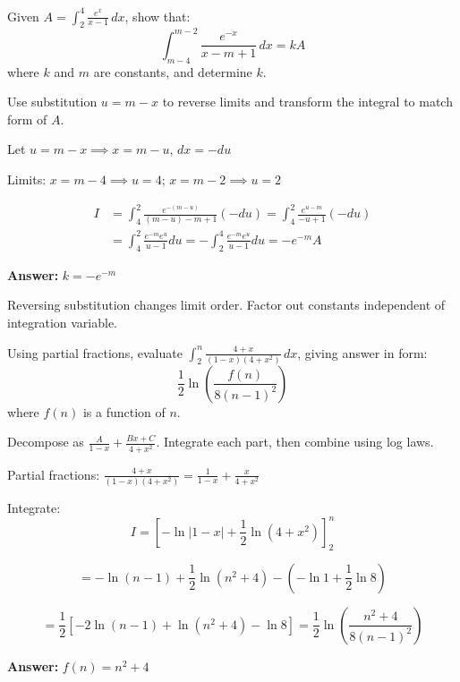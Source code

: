 
\begin{problem}
Given $A = \int_{2}^{4} \frac{e^x}{x-1} \, dx$, show that:
\[
\int_{m-4}^{m-2} \frac{e^{-x}}{x - m + 1} \, dx = kA
\]
where $k$ and $m$ are constants, and determine $k$.
\end{problem}

\begin{hint}
Use substitution $u = m - x$ to reverse limits and transform the integral to match form of $A$.
\end{hint}

\begin{solution}
Let $u = m - x \implies x = m - u$, $dx = -du$

Limits: $x = m-4 \implies u = 4$; $x = m-2 \implies u = 2$

\begin{align*}
I &= \int_{4}^{2} \frac{e^{-(m-u)}}{(m-u) - m + 1} (-du) = \int_{4}^{2} \frac{e^{u-m}}{-u + 1} (-du) \\
&= \int_{4}^{2} \frac{e^{-m} e^{u}}{u - 1} du = -\int_{2}^{4} \frac{e^{-m} e^{u}}{u - 1} du = -e^{-m} A
\end{align*}

\textbf{Answer:} $\boxed{k = -e^{-m}}$
\end{solution}

\begin{takeaways}
Reversing substitution changes limit order. Factor out constants independent of integration variable.
\end{takeaways}

\vspace{1cm}

\begin{problem}
Using partial fractions, evaluate $\displaystyle \int_{2}^{n} \frac{4+x}{(1-x)(4+x^2)} \, dx$, giving answer in form:
\[
\frac{1}{2}\ln\left(\frac{f(n)}{8(n-1)^2}\right)
\]
where $f(n)$ is a function of $n$.
\end{problem}

\begin{hint}
Decompose as $\frac{A}{1-x} + \frac{Bx+C}{4+x^2}$. Integrate each part, then combine using log laws.
\end{hint}

\begin{solution}
Partial fractions: $\frac{4+x}{(1-x)(4+x^2)} = \frac{1}{1-x} + \frac{x}{4+x^2}$

Integrate:
\[
I = \left[ -\ln|1-x| + \frac{1}{2}\ln(4+x^2) \right]_{2}^{n}
\]

\[
= -\ln(n-1) + \frac{1}{2}\ln(n^2+4) - (-\ln 1 + \frac{1}{2}\ln 8)
\]

\[
= \frac{1}{2}[-2\ln(n-1) + \ln(n^2+4) - \ln 8] = \frac{1}{2}\ln\left(\frac{n^2+4}{8(n-1)^2}\right)
\]

\textbf{Answer:} $\boxed{f(n) = n^2 + 4}$
\end{solution}

